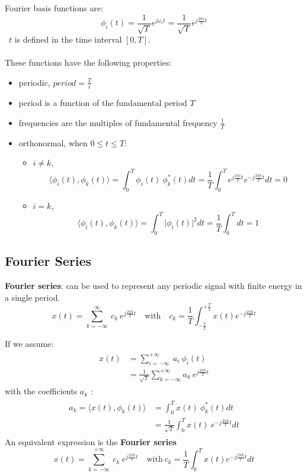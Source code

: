 Fourier basis functions are:
\[ \phi_{i}(t) = \frac{1}{\sqrt{T}} e^{j\omega_{i} t} =  \frac{1}{\sqrt{T}} e^{j\frac{2\pi i}{T} t} \]
\ $t$ is defined in the time interval $[0,T]$.\\\\
These functions have the following properties:
\begin{itemize}
 \item periodic, $period = \frac{T}{i}$
 \item period is a function of the fundamental period $T$
 \item frequencies are the multiples of fundamental frequency $\frac{1}{T}$
 \item orthonormal, when $0 \leq t \leq T$:
 \begin{itemize}
   \item $i \neq k$,  \[ \langle \phi_{i}(t), \phi_{k}(t) \rangle = \int_{0}^{T}  \phi_{i}(t) \ \phi_{k}^{*}(t) dt = \frac{1}{T} \int_{0}^{T} e^{j\frac{2\pi i}{T} t}e^{-j\frac{2\pi k}{T} t} dt = 0\]
   \item $i=k$, \[ \langle \phi_{i}(t), \phi_{k}(t) \rangle  = \int_{0}^{T} \lvert \phi_{i}(t) \rvert^{2}dt = \frac{1}{T} \int_{0}^{T}dt =1\]
\end{itemize} \end{itemize}

\subsection{Fourier Series}
\textbf{Fourier series}: can be used to represent any periodic signal with finite energy in a single period. 
\[ x(t) =  \sum_{k=-\infty}^{\infty} \ c_{k} \ e^{j\frac{2\pi k}{T}t} \quad \text{with} \quad c_{k} = \frac{1}{T} \int_{-\frac{T}{2}}^{+\frac{T}{2}} x(t)e^{-j\frac{2\pi k}{T}t} \]


\begin{dv}{}
If we assume:
\begin{align*}\begin{split}
 x(t) &= \sum_{i=-\infty}^{+\infty} \ a_{i} \ \phi_{i}(t) \\
&= \frac{1}{\sqrt{T}} \sum_{k=-\infty}^{+\infty} a_{k} \ e^{j\frac{2\pi k}{T}t}
\end{split} \end{align*}
with the coefficients $a_{k}$ :
\begin{align*}\begin{split}
a_{k} = \langle x(t), \phi_{k}(t) \rangle &=  \int_{0}^{T} x(t)\ \phi_{k}^{*}(t)dt \\
&=  \frac{1}{\sqrt{T}} \int_{0}^{T} x(t)\ e^{-j\frac{2\pi k}{T}t} dt 
\end{split} \end{align*}
An equivalent expression is the \textbf{Fourier series}
\[ x(t) =  \sum_{k=-\infty}^{+\infty} \ c_{k} \ e^{j\frac{2\pi k}{T}t} \quad \text{with} \ c_{k} = \frac{1}{T} \int_{0}^{T} x(t)e^{-j\frac{2\pi k}{T}t} dt \]
\end{dv}

